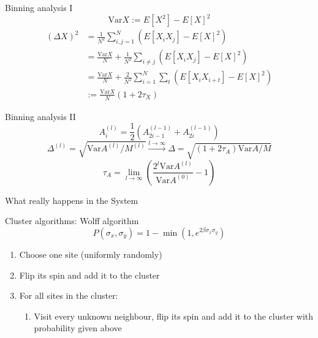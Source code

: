 \documentclass[]{beamer}
\begin{document}
\begin{frame}{Binning analysis I}
\[ \text{Var} X := E \left[ X^2 \right] - E \left[ X \right]^2 \]
\begin{align*}
(\Delta X)^2 &= \frac{1}{N^2} \sum\limits_{i,j=1}^N \left( E \left[ X_i X_j \right] - E \left[ X \right]^2 \right) \\
&= \frac{\text{Var}X}{N}+\frac{1}{N^2}\sum\limits_{i\neq j} \left( E \left[X_i X_j \right] - E \left[ X \right]^2 \right) \\
&= \frac{\text{Var}X}{N}+\frac{2}{N^2}\sum\limits_{i=1}^N \sum\limits_t \left( E\left[X_i X_{i+t} \right] - E \left[ X \right]^2 \right) \\
&:= \frac{\text{Var}X}{N}\left(1+2\tau_X\right)
\end{align*}
\end{frame}

\begin{frame}{Binning analysis II}
\[ A_i^{(l)} = \frac{1}{2} \left( A_{2i-1}^{(l-1)} + A_{2i}^{(l-1)} \right) \]
\[ \Delta^{(l)} = \sqrt{\text{Var}A^{(l)}/M^{(l)}}  \stackrel{l \rightarrow \infty}{\rightarrow} \Delta = \sqrt{(1+2\tau_A)\text{Var}A/M} \]
\[ \tau_A = \lim_{l\rightarrow\infty}\left( \frac{2^l \text{Var} A^{(l)}}{\text{Var} A^{(0)}} - 1 \right) \]
\end{frame}

\begin{frame}{What really happens in the System}
\end{frame}

\begin{frame}{Cluster algorithms: Wolff algorithm}
\[ P(\sigma_x, \sigma_y) = 1 - \min \left( 1,e^{2\beta \sigma_x \sigma_y} \right) \]
\begin{enumerate}
\item<2-> Choose one site (uniformly randomly)
\item<3-> Flip its spin and add it to the cluster
\item<4-> For all sites in the cluster:
	\begin{enumerate}
	\item Visit every unknown neighbour, flip its spin and add it to the cluster with probability given above
	\end{enumerate}
\end{enumerate}
\end{frame}
\end{document}

